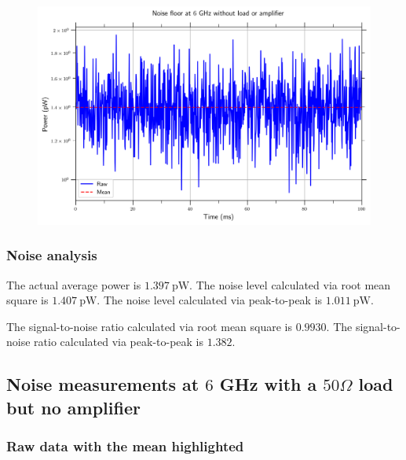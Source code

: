 \documentclass[english,12pt,a4paper]{article}
\begin{document}
\begin{figure}[H]
	\includegraphics[width=1\linewidth]{Plots/noise_floor_6_GHz}
	\caption[Noise floor at 6 GHz]{}
	\label{fig:noisefloor6ghz}
\end{figure}



\hypertarget{noise-analysis}{%
	\subsubsection{Noise analysis}\label{noise-analysis_1}}

	The actual average power is $\qty{1.397}{\pico\watt}$.
	The noise level calculated via root mean square is $\qty{1.407}{\pico\watt}$.
	The noise level calculated via peak-to-peak is $\qty{1.011}{\pico\watt}$.
	
	The signal-to-noise ratio calculated via root mean square is $0.9930$.
	The signal-to-noise ratio calculated via peak-to-peak is $1.382$.


\hypertarget{noise-measurements-at-6-ghz-with-a-50-omega-load-but-no-amplifier}{%
	\subsection{\texorpdfstring{Noise measurements at \(6\) GHz with a
			\(50 \Omega\) load but no
			amplifier}{Noise measurements at 6 GHz with a 50 \textbackslash Omega load but no amplifier}}\label{noise-measurements-at-6-ghz-with-a-50-omega-load-but-no-amplifier}}



\hypertarget{raw-data-with-the-mean-highlighted}{%
	\subsubsection{Raw data with the mean
		highlighted}\label{raw-data-with-the-mean-highlighted-6}}
\end{document}
